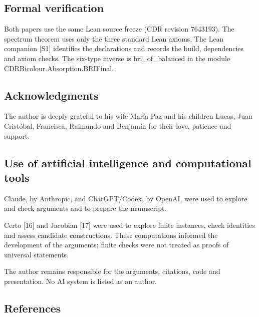 \documentclass[english,11pt,a4paper]{article}
\begin{document}
\subsection{Formal verification}\label{formal-verification}

Both papers use the same Lean source freeze (CDR revision 7643193). The spectrum theorem uses only the three standard Lean axioms. The Lean companion {[}S1{]} identifies the declarations and records the build, dependencies and axiom checks. The six-type inverse is bri\_of\_balanced in the module CDRBicolour.Absorption.BRIFinal.

\subsection{Acknowledgments}\label{acknowledgments}

The author is deeply grateful to his wife María Paz and his children Lucas, Juan Cristóbal, Francisca, Raimundo and Benjamín for their love, patience and support.

\subsection{Use of artificial intelligence and computational tools}\label{use-of-artificial-intelligence-and-computational-tools}

Claude, by Anthropic, and ChatGPT/Codex, by OpenAI, were used to explore and check arguments and to prepare the manuscript.

Certo {[}16{]} and Jacobian {[}17{]} were used to explore finite instances, check identities and assess candidate constructions. These computations informed the development of the arguments; finite checks were not treated as proofs of universal statements.

The author remains responsible for the arguments, citations, code and presentation. No AI system is listed as an author.

\subsection{References}\label{references}
\end{document}
